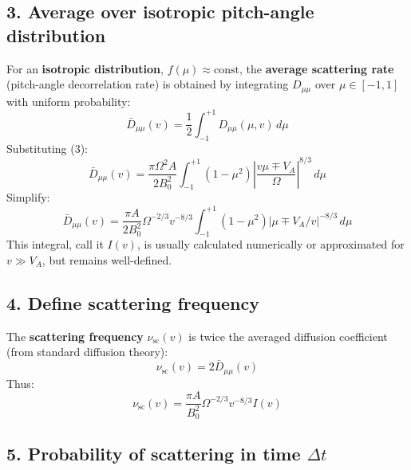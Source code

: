 \hrulefill

\subsection*{3. \textbf{Average over isotropic pitch-angle distribution}}

For an \textbf{isotropic distribution}, $f(\mu) \approx \text{const}$, the \textbf{average scattering rate} (pitch-angle decorrelation rate) is obtained by integrating $D_{\mu\mu}$ over $\mu \in [-1,1]$ with uniform probability:
\begin{equation}
\bar{D}_{\mu\mu}(v) = \frac{1}{2} \int_{-1}^{+1} D_{\mu\mu}(\mu, v) \, d\mu
\tag{4}
\end{equation}
Substituting (3):
\begin{equation}
\bar{D}_{\mu\mu}(v) = \frac{\pi \Omega^2 A}{2 B_0^2} \int_{-1}^{+1} (1 - \mu^2) \left| \frac{v \mu \mp V_A}{\Omega} \right|^{8/3} \, d\mu
\tag{5}
\end{equation}
Simplify:
\begin{equation}
\bar{D}_{\mu\mu}(v) = \frac{\pi A}{2 B_0^2} \Omega^{-2/3} v^{-8/3} \int_{-1}^{+1} (1 - \mu^2) |\mu \mp V_A/v|^{-8/3} \, d\mu
\tag{6}
\end{equation}
This integral, call it $I(v)$, is usually calculated numerically or approximated for $v \gg V_A$, but remains well-defined.

\hrulefill

\subsection*{4. \textbf{Define scattering frequency}}

The \textbf{scattering frequency} $\nu_{\text{sc}}(v)$ is twice the averaged diffusion coefficient (from standard diffusion theory):
\begin{equation}
\nu_{\text{sc}}(v) = 2 \bar{D}_{\mu\mu}(v)
\tag{7}
\end{equation}
Thus:
\begin{equation}
\nu_{\text{sc}}(v) = \frac{\pi A}{B_0^2} \Omega^{-2/3} v^{-8/3} I(v)
\tag{8}
\end{equation}

\hrulefill

\subsection*{5. \textbf{Probability of scattering in time $\Delta t$}}

